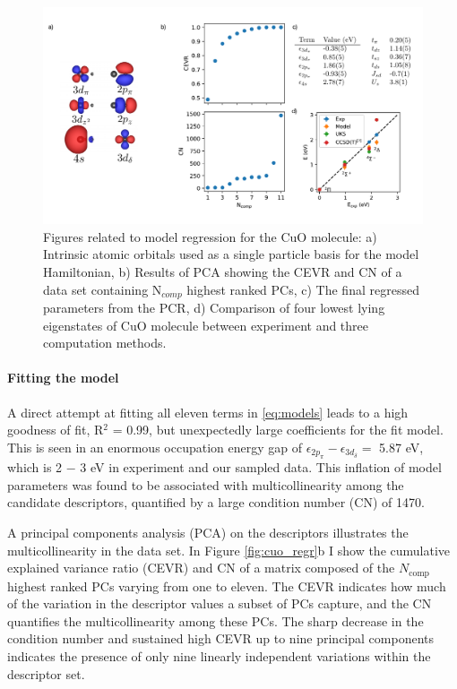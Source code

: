 \documentclass[12pt]{article}
\begin{document}
\begin{figure}
\centering
\includegraphics[width=1.0\linewidth]{./figs/cuo_regr_2.pdf}
\caption{Figures related to model regression for the CuO molecule: a) Intrinsic atomic orbitals used as a single particle basis for the model Hamiltonian, b) Results of PCA showing the CEVR and CN of a data set containing N$_{comp}$  highest ranked PCs, c) The final regressed parameters from the PCR, d) Comparison of four lowest lying eigenstates of CuO molecule between experiment and three computation methods.}
\label{fig:cuo_regr}
\end{figure}

\vspace{-10pt}
\paragraph{Fitting the model}
A direct attempt at fitting all eleven terms in \eqref{eq:models} leads to a high goodness of fit, R$^2$ = 0.99, but unexpectedly large coefficients for the fit model.
This is seen in an enormous occupation energy gap of $\epsilon_{2p_\pi} - \epsilon_{3d_\delta} = $ 5.87 eV, which is 2 $-$ 3 eV in experiment and our sampled data.
This inflation of model parameters was found to be associated with multicollinearity among the candidate descriptors, quantified by a large condition number (CN) of 1470.

A principal components analysis (PCA) on the descriptors illustrates the multicollinearity in the data set.
In Figure \eqref{fig:cuo_regr}b I show the cumulative explained variance ratio (CEVR) and CN of a matrix composed of the $N_\text{comp}$ highest ranked PCs varying from one to eleven.
The CEVR indicates how much of the variation in the descriptor values a subset of PCs capture, and the CN quantifies the multicollinearity among these PCs.
The sharp decrease in the condition number and sustained high CEVR up to nine principal components indicates the presence of only nine linearly independent variations within the descriptor set.
\end{document}
